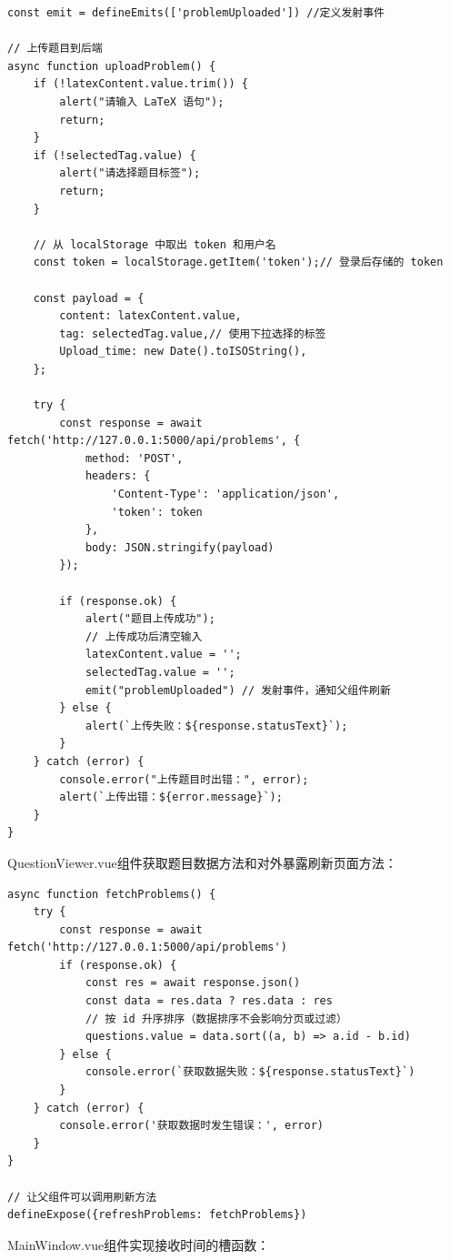 \documentclass[a4paper,AutoFakeBold={2.7}]{ctexart} %
\begin{document}
\begin{lstlisting}
const emit = defineEmits(['problemUploaded']) //定义发射事件

// 上传题目到后端
async function uploadProblem() {
    if (!latexContent.value.trim()) {
        alert("请输入 LaTeX 语句");
        return;
    }
    if (!selectedTag.value) {
        alert("请选择题目标签");
        return;
    }

    // 从 localStorage 中取出 token 和用户名
    const token = localStorage.getItem('token');// 登录后存储的 token

    const payload = {
        content: latexContent.value,
        tag: selectedTag.value,// 使用下拉选择的标签
        Upload_time: new Date().toISOString(),
    };

    try {
        const response = await fetch('http://127.0.0.1:5000/api/problems', {
            method: 'POST',
            headers: {
                'Content-Type': 'application/json',
                'token': token
            },
            body: JSON.stringify(payload)
        });

        if (response.ok) {
            alert("题目上传成功");
            // 上传成功后清空输入
            latexContent.value = '';
            selectedTag.value = '';
            emit("problemUploaded") // 发射事件，通知父组件刷新
        } else {
            alert(`上传失败：${response.statusText}`);
        }
    } catch (error) {
        console.error("上传题目时出错：", error);
        alert(`上传出错：${error.message}`);
    }
}
\end{lstlisting}

QuestionViewer.vue组件获取题目数据方法和对外暴露刷新页面方法：

\begin{lstlisting}
async function fetchProblems() {
    try {
        const response = await fetch('http://127.0.0.1:5000/api/problems')
        if (response.ok) {
            const res = await response.json()
            const data = res.data ? res.data : res
            // 按 id 升序排序（数据排序不会影响分页或过滤）
            questions.value = data.sort((a, b) => a.id - b.id)
        } else {
            console.error(`获取数据失败：${response.statusText}`)
        }
    } catch (error) {
        console.error('获取数据时发生错误：', error)
    }
}

// 让父组件可以调用刷新方法
defineExpose({refreshProblems: fetchProblems})
\end{lstlisting}

MainWindow.vue组件实现接收时间的槽函数：
\end{document}

